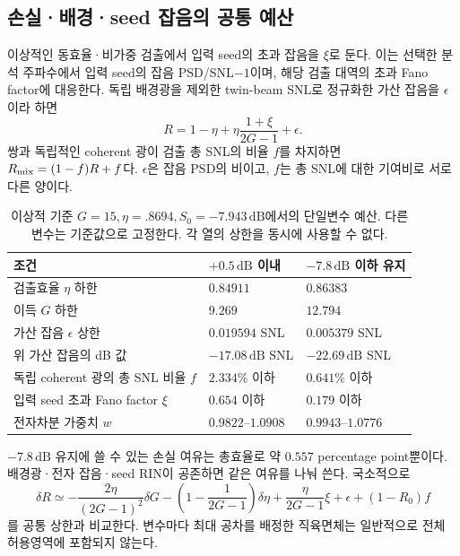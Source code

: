 \documentclass[11pt,a4paper]{article}
\newcommand{\dB}{\,\mathrm{dB}}
\begin{document}
\subsection{손실·배경·seed 잡음의 공통 예산}
이상적인 동효율·비가중 검출에서 입력 seed의 초과 잡음을 $\xi$로 둔다.
이는 선택한 분석 주파수에서 입력 seed의 잡음 PSD/SNL$-1$이며,
해당 검출 대역의 초과 Fano factor에 대응한다. 독립 배경광을 제외한
twin-beam SNL로 정규화한 가산 잡음을 $\epsilon$이라 하면
\begin{equation}
 R=1-\eta+\eta\frac{1+\xi}{2G-1}+\epsilon.
 \label{eq:budget}
\end{equation}
쌍과 독립적인 coherent 광이 검출 총 SNL의 비율 $f$를 차지하면
$R_{\rm mix}=(1-f)R+f$다. $\epsilon$은 잡음 PSD의 비이고,
$f$는 총 SNL에 대한 기여비로 서로 다른 양이다.

\begin{table}[htbp]\centering
\caption{이상적 기준 $G=15,\eta=.8694,S_0=-7.943\dB$에서의 단일변수 예산.
다른 변수는 기준값으로 고정한다. 각 열의 상한을 동시에 사용할 수 없다.}
\label{tab:budget}
\begin{tabularx}{\linewidth}{P{5.2cm}YY}
\toprule 조건 & $+0.5\dB$ 이내 & $-7.8\dB$ 이하 유지\\\midrule
검출효율 $\eta$ 하한 & $0.84911$ & $0.86383$\\
이득 $G$ 하한 & $9.269$ & $12.794$\\
가산 잡음 $\epsilon$ 상한 & $0.019594$ SNL & $0.005379$ SNL\\
위 가산 잡음의 dB 값 & $-17.08\dB$ SNL & $-22.69\dB$ SNL\\
독립 coherent 광의 총 SNL 비율 $f$ & $2.334\%$ 이하 & $0.641\%$ 이하\\
입력 seed 초과 Fano factor $\xi$ & $0.654$ 이하 & $0.179$ 이하\\
전자차분 가중치 $w$ & $0.9822$--$1.0908$ & $0.9943$--$1.0776$\\
\bottomrule
\end{tabularx}
\end{table}

$-7.8\dB$ 유지에 쓸 수 있는 손실 여유는 총효율로 약 $0.557$
percentage point뿐이다. 배경광·전자 잡음·seed RIN이 공존하면 같은
여유를 나눠 쓴다. 국소적으로
\begin{equation}
 \delta R\simeq-\frac{2\eta}{(2G-1)^2}\delta G
 -\left(1-\frac1{2G-1}\right)\delta\eta
 +\frac{\eta}{2G-1}\xi+\epsilon+(1-R_0)f
\end{equation}
를 공통 상한과 비교한다. 변수마다 최대 공차를 배정한 직육면체는 일반적으로
전체 허용영역에 포함되지 않는다.
\end{document}
